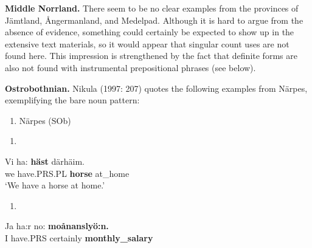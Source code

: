 \textbf{Middle Norrland.} There seem to be no clear examples from the provinces of Jämtland, Ångermanland, and Medelpad. Although it is hard to argue from the absence of evidence, something could certainly be expected to show up in the extensive text materials, so it would appear that singular count uses are not found here. This impression is strengthened by the fact that definite forms are also not found with instrumental prepositional phrases (see below). 

\textbf{Ostrobothnian.} Nikula (1997: 207) quotes the following examples from Närpes, exemplifying the bare noun pattern:

\begin{enumerate} %
\item 
Närpes (SOb) 

\end{enumerate} %
\setcounter{listLFOxcviiileveli}{0}
\begin{enumerate} %
\item 
\end{enumerate} %
\ea\label{}
\gll Vi  ha:  \textbf{häst} därhäim.\\


we  have.PRS.PL  \textbf{horse} at\_home\\ %


‘We have a horse at home.’
\z


\begin{enumerate} %
\item 
\end{enumerate} %
\ea\label{}
\gll Ja  ha:r  no:  \textbf{moånanslyö:n.}\\


I  have.PRS  certainly  \textbf{monthly\_salary}\\ %


